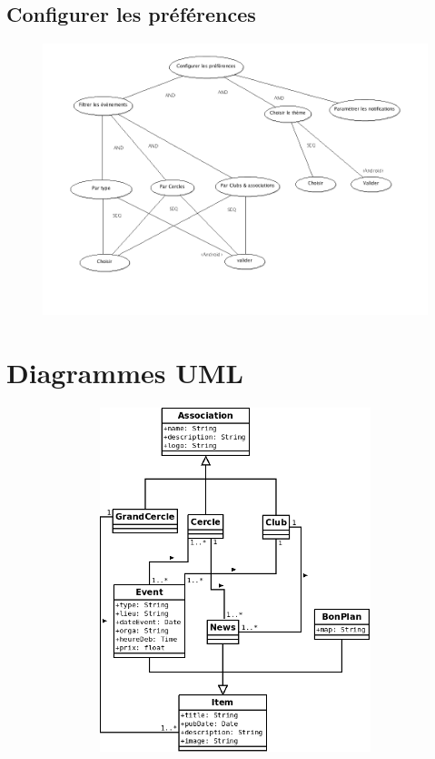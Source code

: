 \documentclass[a4paper, 11px]{article}
\begin{document}
\subsection{Configurer les préférences}
\begin{figure}[h]
\includegraphics[width = \textwidth]{configurer_preferences.png}
\end{figure}
\vfill
\clearpage

\section{Diagrammes UML}
\begin{figure}[h]
\includegraphics[width = 12cm,height=10cm]{classes.png}
\end{figure}
\vfill
\clearpage
\end{document}
